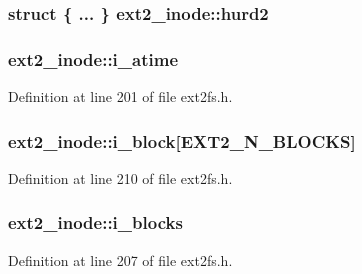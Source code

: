 \hypertarget{structext2__inode_a5ef772ebfbb0ea1984ac86a3e790fa62}{
\subsubsection[{hurd2}]{\setlength{\rightskip}{0pt plus 5cm}struct \{ ... \}   {\bf ext2\-\_\-inode\-::hurd2}}}\label{structext2__inode_a5ef772ebfbb0ea1984ac86a3e790fa62}
\hypertarget{structext2__inode_adb682923fb8b418217d78fd78737406b}{
\subsubsection[{i\-\_\-atime}]{ {\bf ext2\-\_\-inode\-::i\-\_\-atime}}}\label{structext2__inode_adb682923fb8b418217d78fd78737406b}


\-Definition at line 201 of file ext2fs.\-h.

\hypertarget{structext2__inode_a4156ec7389c2531f20ce41bf65d851bd}{
\subsubsection[{i\-\_\-block}]{ {\bf ext2\-\_\-inode\-::i\-\_\-block}\mbox{[}{\bf \-E\-X\-T2\-\_\-\-N\-\_\-\-B\-L\-O\-C\-K\-S}\mbox{]}}}\label{structext2__inode_a4156ec7389c2531f20ce41bf65d851bd}


\-Definition at line 210 of file ext2fs.\-h.

\hypertarget{structext2__inode_a6e5b258ebc92b6ae75c61572c60cbb4b}{
\subsubsection[{i\-\_\-blocks}]{ {\bf ext2\-\_\-inode\-::i\-\_\-blocks}}}\label{structext2__inode_a6e5b258ebc92b6ae75c61572c60cbb4b}


\-Definition at line 207 of file ext2fs.\-h.

